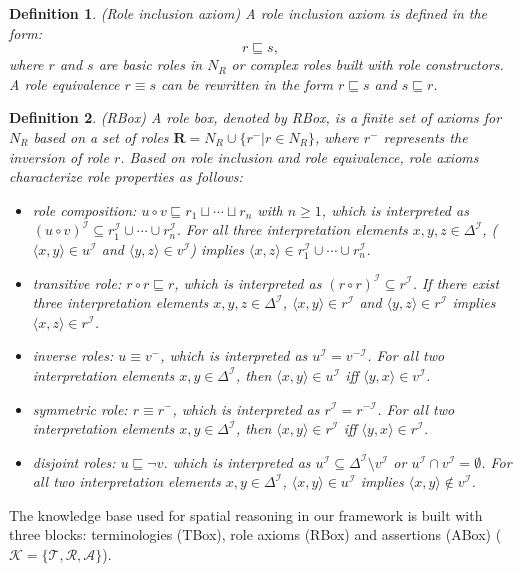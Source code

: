 \documentclass{article}
\newtheorem{mydef}{Definition}
\begin{document}
\begin{mydef}(Role inclusion axiom) 
 A role inclusion axiom is defined in the form:
 $$r\sqsubseteq s,$$
 where $r$ and $s$ are basic roles in $N_R$ or complex roles built with role constructors. A role equivalence $r\equiv s$ can be rewritten in the form $r\sqsubseteq s$ and $s\sqsubseteq r$.
\end{mydef}
\begin{mydef}(RBox)
A role box, denoted by RBox, is a finite set
of axioms for $N_R$  based on a set of roles $\mathbf{R}=N_R\cup\{r^-| r\in N_R\}$, where $r^-$  represents the inversion of role $r$.
Based on role inclusion and role equivalence, role axioms characterize role properties as follows:
\begin{itemize}
 \item role composition: $u\circ v \sqsubseteq r_1\sqcup \cdots\sqcup r_n$ with $n\geqslant 1$, which is interpreted as 
 $(u\circ v)^\mathcal{I} \subseteq r_1^\mathcal{I} \cup \cdots \cup r_n^\mathcal{I}$. For all three interpretation elements $x,y,z\in \Delta^\mathcal{I}$, 
 ($\langle x,y \rangle \in u^\mathcal{I}$ and $\langle y,z \rangle \in v^\mathcal{I}$) implies  $\langle x,z \rangle \in r_1^\mathcal{I} \cup \cdots \cup r_n^\mathcal{I}$. 
 \item transitive role: $r\circ r \sqsubseteq r$, which is interpreted as $(r\circ r)^\mathcal{I} \subseteq r^\mathcal{I}$. If there exist three interpretation elements
 $x,y,z\in \Delta^\mathcal{I}$, $\langle x,y \rangle \in r^\mathcal{I}$ and $\langle y,z \rangle \in r^\mathcal{I}$ implies  $\langle x,z \rangle \in r^\mathcal{I}$.
 \item inverse roles: $u \equiv v^-$, which is interpreted as $u^\mathcal{I} = v^{-\mathcal{I}}$. For all two interpretation elements  $x,y\in \Delta^\mathcal{I}$,
 then $\langle x,y \rangle \in u^\mathcal{I}$ iff $\langle y,x \rangle \in v^\mathcal{I}$.
 \item symmetric role: $r \equiv r^-$, which is interpreted as $r^\mathcal{I} = r^{-\mathcal{I}}$. For all two interpretation elements  $x,y\in \Delta^\mathcal{I}$,
 then $\langle x,y \rangle \in r^\mathcal{I}$ iff $\langle y,x \rangle \in r^\mathcal{I}$.
 \item disjoint roles: $u\sqsubseteq \neg v$. which is interpreted as $u^\mathcal{I} \subseteq \Delta^\mathcal{I} \setminus v^\mathcal{I}$ or $u^\mathcal{I}\cap v^\mathcal{I}=\emptyset$. 
 For all two interpretation elements  $x,y\in \Delta^\mathcal{I}$, 
$\langle x,y \rangle \in u^\mathcal{I}$ implies $\langle x,y \rangle \notin v^\mathcal{I}$.
\end{itemize}
\end{mydef}
The knowledge base used for spatial reasoning in our framework is built with three blocks: terminologies (TBox), role axioms (RBox) and assertions (ABox)
($\mathcal{K}=\{\mathcal{T},\mathcal{R},\mathcal{A}\}$).
\end{document}
